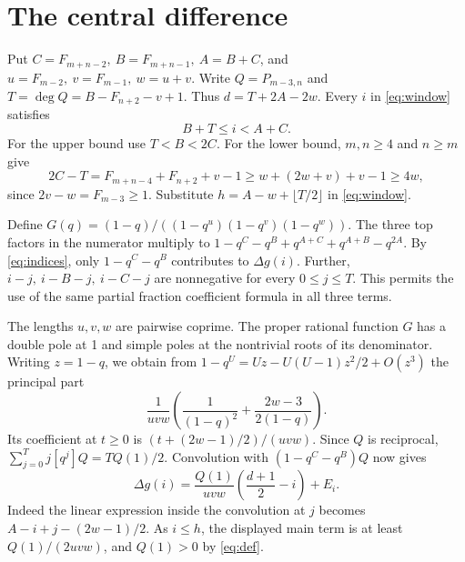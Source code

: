 \documentclass[11pt]{article}
\newcommand{\dd}{\Delta}
\begin{document}
\section{The central difference}
Put \(C=F_{m+n-2},\ B=F_{m+n-1},\ A=B+C\), and
\(u=F_{m-2},\ v=F_{m-1},\ w=u+v\). Write \(Q=P_{m-3,n}\) and
\(T=\deg Q=B-F_{n+2}-v+1\). Thus \(d=T+2A-2w\).
Every \(i\) in \eqref{eq:window} satisfies
\begin{equation}\label{eq:indices}
 B+T\le i<A+C .
\end{equation}
For the upper bound use \(T<B<2C\). For the lower bound,
\(m,n\ge4\) and \(n\ge m\) give
\[
 2C-T=F_{m+n-4}+F_{n+2}+v-1
 \ge w+(2w+v)+v-1\ge4w,
\]
since \(2v-w=F_{m-3}\ge1\). Substitute
\(h=A-w+\lfloor T/2\rfloor\) in \eqref{eq:window}.

Define \(G(q)=(1-q)/((1-q^u)(1-q^v)(1-q^w))\). The three top factors
in the numerator multiply to
\(1-q^C-q^B+q^{A+C}+q^{A+B}-q^{2A}\).
By \eqref{eq:indices}, only \(1-q^C-q^B\) contributes to \(\dd g(i)\).
Further, \(i-j,\ i-B-j,\ i-C-j\) are nonnegative for every
\(0\le j\le T\). This permits the use of the same partial fraction
coefficient formula in all three terms.

The lengths \(u,v,w\) are pairwise coprime. The proper rational
function \(G\) has a double pole at 1 and simple poles at the
nontrivial roots of its denominator. Writing \(z=1-q\), we obtain
from \(1-q^U=Uz-U(U-1)z^2/2+O(z^3)\) the principal part
\[
 \frac1{uvw}\left(\frac1{(1-q)^2}
       +\frac{2w-3}{2(1-q)}\right).
\]
Its coefficient at \(t\ge0\) is \((t+(2w-1)/2)/(uvw)\).
Since \(Q\) is reciprocal, \(\sum_{j=0}^T j[q^j]Q=TQ(1)/2\).
Convolution with \((1-q^C-q^B)Q\) now gives
\begin{equation}\label{eq:main}
 \dd g(i)=\frac{Q(1)}{uvw}\left(\frac{d+1}{2}-i\right)+E_i .
\end{equation}
Indeed the linear expression inside the convolution at \(j\) becomes
\(A-i+j-(2w-1)/2\). As \(i\le h\), the displayed main term is at
least \(Q(1)/(2uvw)\), and \(Q(1)>0\) by \eqref{eq:def}.
\end{document}
